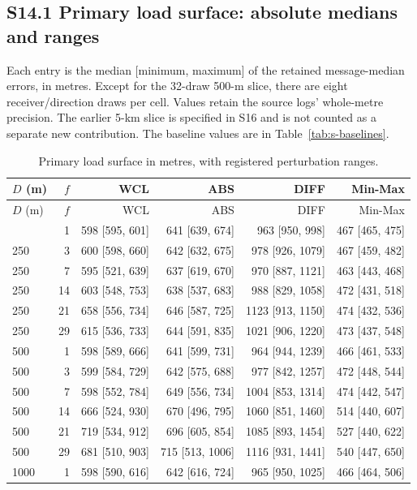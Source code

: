 \documentclass[journal,onecolumn,10pt]{IEEEtran}
\begin{document}
\subsection*{S14.1 Primary load surface: absolute medians and ranges}
Each entry is the median [minimum, maximum] of the retained message-median errors, in metres. Except for the 32-draw 500-m slice, there are eight receiver/direction draws per cell. Values retain the source logs' whole-metre precision. The earlier 5-km slice is specified in S16 and is not counted as a separate new contribution. The baseline values are in Table~\ref{tab:s-baselines}.
\begingroup\small
\begin{longtable}{@{}lrrrrr@{}}
\caption{Primary load surface in metres, with registered perturbation ranges.}\label{tab:s-load-ranges}\\
\toprule
$D$ (m) & $f$ & WCL & ABS & DIFF & Min-Max \\
\midrule\endfirsthead
\toprule
$D$ (m) & $f$ & WCL & ABS & DIFF & Min-Max \\
\midrule\endhead
\bottomrule\endfoot
250 & 1 & 598 [595, 601] & 641 [639, 674] & 963 [950, 998] & 467 [465, 475] \\
250 & 3 & 600 [598, 660] & 642 [632, 675] & 978 [926, 1079] & 467 [459, 482] \\
250 & 7 & 595 [521, 639] & 637 [619, 670] & 970 [887, 1121] & 463 [443, 468] \\
250 & 14 & 603 [548, 753] & 638 [537, 683] & 988 [829, 1058] & 472 [431, 518] \\
250 & 21 & 658 [556, 734] & 646 [587, 725] & 1123 [913, 1150] & 474 [432, 536] \\
250 & 29 & 615 [536, 733] & 644 [591, 835] & 1021 [906, 1220] & 473 [437, 548] \\
500 & 1 & 598 [589, 666] & 641 [599, 731] & 964 [944, 1239] & 466 [461, 533] \\
500 & 3 & 599 [584, 729] & 642 [575, 688] & 977 [842, 1257] & 472 [448, 544] \\
500 & 7 & 598 [552, 784] & 649 [556, 734] & 1004 [853, 1314] & 474 [442, 547] \\
500 & 14 & 666 [524, 930] & 670 [496, 795] & 1060 [851, 1460] & 514 [440, 607] \\
500 & 21 & 719 [534, 912] & 696 [605, 854] & 1085 [893, 1454] & 527 [440, 622] \\
500 & 29 & 681 [510, 903] & 715 [513, 1006] & 1116 [931, 1441] & 540 [447, 650] \\
1000 & 1 & 598 [590, 616] & 642 [616, 724] & 965 [950, 1025] & 466 [464, 506] \\

\end{longtable}
\end{document}
